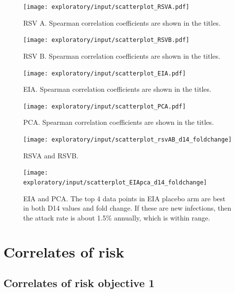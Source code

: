 \documentclass[11pt]{article}
\begin{document}
\clearpage
\begin{figure}[H]
    \centering
    \texttt{[image: exploratory/input/scatterplot\_RSVA.pdf]}
    \caption{RSV A. Spearman correlation coefficients are shown in the titles.}
    \label{fig:scatterplot_RSVA}
\end{figure}

\begin{figure}[H]
    \centering
    \texttt{[image: exploratory/input/scatterplot\_RSVB.pdf]}
    \caption{RSV B. Spearman correlation coefficients are shown in the titles.}
    \label{fig:scatterplot_RSVB}
\end{figure}

\begin{figure}[H]
    \centering
    \texttt{[image: exploratory/input/scatterplot\_EIA.pdf]}
    \caption{EIA. Spearman correlation coefficients are shown in the titles.}
    \label{fig:scatterplot_EIA}
\end{figure}

\begin{figure}[H]
    \centering
    \texttt{[image: exploratory/input/scatterplot\_PCA.pdf]}
    \caption{PCA. Spearman correlation coefficients are shown in the titles.}
    \label{fig:scatterplot_PCA}
\end{figure}

\begin{figure}[H]
    \centering
    \texttt{[image: exploratory/input/scatterplot\_rsvAB\_d14\_foldchange]}
    \caption{RSVA and RSVB.}
\end{figure}

\begin{figure}[H]
    \centering
    \texttt{[image: exploratory/input/scatterplot\_EIApca\_d14\_foldchange]}
    \label{fig:scatterplot_EIApca_d14_foldchange}
    \caption{EIA and PCA. The top 4 data points in EIA placebo arm are best in both D14 values and fold change. If these are new infections, then the attack rate is about 1.5\% annually, which is within range. }
\end{figure}

\clearpage

\clearpage

\hypertarget{correlates-of-risk}{%
\section{Correlates of risk}\label{correlates-of-risk}}

\hypertarget{correlates-of-risk-objective-1}{%
\subsection{Correlates of risk objective 1}\label{correlates-of-risk-objective-1}}
\end{document}
